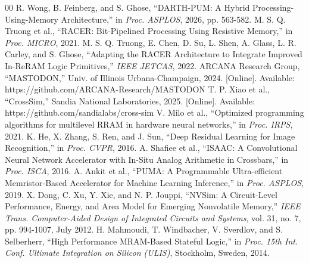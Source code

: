 \documentclass[conference]{IEEEtran}
\begin{document}
\begin{thebibliography}{00}
 R. Wong, B. Feinberg, and S. Ghose, ``DARTH-PUM: A Hybrid Processing-Using-Memory Architecture,'' in \emph{Proc. ASPLOS}, 2026, pp. 563-582.
 M. S. Q. Truong et al., ``RACER: Bit-Pipelined Processing Using Resistive Memory,'' in \emph{Proc. MICRO}, 2021.
 M. S. Q. Truong, E. Chen, D. Su, L. Shen, A. Glass, L. R. Carley, and S. Ghose, ``Adapting the RACER Architecture to Integrate Improved In-ReRAM Logic Primitives,'' \emph{IEEE JETCAS}, 2022.
 ARCANA Research Group, ``MASTODON,'' Univ. of Illinois Urbana-Champaign, 2024. [Online]. Available: https://github.com/ARCANA-Research/MASTODON
 T. P. Xiao et al., ``CrossSim,'' Sandia National Laboratories, 2025. [Online]. Available: https://github.com/sandialabs/cross-sim
 V. Milo et al., ``Optimized programming algorithms for multilevel RRAM in hardware neural networks,'' in \emph{Proc. IRPS}, 2021.
 K. He, X. Zhang, S. Ren, and J. Sun, ``Deep Residual Learning for Image Recognition,'' in \emph{Proc. CVPR}, 2016.
 A. Shafiee et al., ``ISAAC: A Convolutional Neural Network Accelerator with In-Situ Analog Arithmetic in Crossbars,'' in \emph{Proc. ISCA}, 2016.
 A. Ankit et al., ``PUMA: A Programmable Ultra-efficient Memristor-Based Accelerator for Machine Learning Inference,'' in \emph{Proc. ASPLOS}, 2019.
 X. Dong, C. Xu, Y. Xie, and N. P. Jouppi, ``NVSim: A Circuit-Level Performance, Energy, and Area Model for Emerging Nonvolatile Memory,'' \emph{IEEE Trans. Computer-Aided Design of Integrated Circuits and Systems}, vol. 31, no. 7, pp. 994-1007, July 2012.
 H. Mahmoudi, T. Windbacher, V. Sverdlov, and S. Selberherr, ``High Performance MRAM-Based Stateful Logic,'' in \emph{Proc. 15th Int. Conf. Ultimate Integration on Silicon (ULIS)}, Stockholm, Sweden, 2014.
\end{thebibliography}
\end{document}
